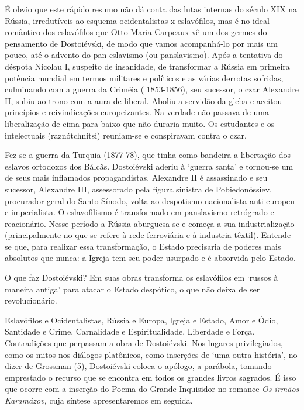 É obvio que este rápido resumo não dá conta das lutas internas do século
XIX na Rússia, irredutíveis ao esquema ocidentalistas x eslavófilos, mas
é no ideal romântico dos eslavófilos que Otto Maria Carpeaux vê um dos
germes do pensamento de Dostoiévski, de modo que vamos acompanhá-lo por
mais um pouco, até o advento do pan-eslavismo (ou panslavismo). Após a
tentativa do déspota Nicolau I, suspeito de insanidade, de transformar a
Rússia em primeira potência mundial em termos militares e políticos e as
várias derrotas sofridas, culminando com a guerra da Criméia (
1853-1856), seu sucessor, o czar Alexandre II, subiu ao trono com a aura
de liberal. Aboliu a servidão da gleba e aceitou princípios e
reivindicações europeizantes. Na verdade não passava de uma
liberalização de cima para baixo que não duraria muito. Os estudantes e
os intelectuais (raznótchnitsi) reuniam-se e conspiravam contra o czar.

Fez-se a guerra da Turquia (1877-78), que tinha como bandeira a
libertação dos eslavos ortodoxos dos Bálcãs. Dostoiévski aderiu à
`guerra santa' e tornou-se um de seus mais inflamados propagandistas.
Alexandre II é assassinado e seu sucessor, Alexandre III, assessorado
pela figura sinistra de Pobiedonóssiev, procurador-geral do Santo
Sínodo, volta ao despotismo nacionalista anti-europeu e imperialista. O
eslavofilismo é transformado em panslavismo retrógrado e reacionário.
Nesse período a Rússia aburguesa-se e começa a sua industrialização
(principalmente no que se refere à rede ferroviária e à industria
têxtil). Entende-se que, para realizar essa transformação, o Estado
precisaria de poderes mais absolutos que nunca: a Igreja tem seu poder
usurpado e é absorvida pelo Estado.

O que faz Dostoiévski? Em suas obras transforma os eslavófilos em
`russos à maneira antiga' para atacar o Estado despótico, o que não
deixa de ser revolucionário.

Eslavófilos e Ocidentalistas, Rússia e Europa, Igreja e Estado, Amor e
Ódio, Santidade e Crime, Carnalidade e Espiritualidade, Liberdade e
Força. Contradições que perpassam a obra de Dostoiévski. Nos lugares
privilegiados, como os mitos nos diálogos platônicos, como inserções de
`uma outra história', no dizer de Grossman (5), Dostoiévski coloca o
apólogo, a parábola, tomando emprestado o recurso que se encontra em
todos os grandes livros sagrados. É isso que ocorre com a inserção do
Poema do Grande Inquisidor no romance \emph{Os irmãos Karamázov,} cuja
síntese apresentaremos em seguida.

